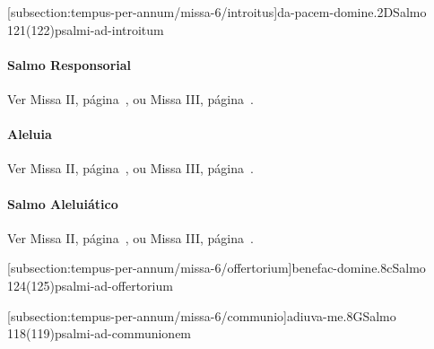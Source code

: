 \def\Prefix{subsection:tempus-per-annum/missa-6}

[\Prefix/introitus]{da-pacem-domine.2D}{Salmo 121(122)}{psalmi-ad-introitum}

\paragraph{Salmo Responsorial}
\begin{rubrica}
  Ver Missa II, página~\pageref{subsection:tempus-per-annum/missa-2/psalmus-responsorius}, ou Missa III, página~\pageref{subsection:tempus-per-annum/missa-3/psalmus-responsorius}.
\end{rubrica}

\paragraph{Aleluia}
\begin{rubrica}
  Ver Missa II, página~\pageref{subsection:tempus-per-annum/missa-2/alleluia}, ou Missa III, página~\pageref{subsection:tempus-per-annum/missa-3/alleluia}.
\end{rubrica}

\paragraph{Salmo Aleluiático}
\begin{rubrica}
  Ver Missa II, página~\pageref{subsection:tempus-per-annum/missa-2/psalmus-alleluiaticus}, ou Missa III, página~\pageref{subsection:tempus-per-annum/missa-3/psalmus-alleluiaticus}.
\end{rubrica}

\AllowPageFlush

[\Prefix/offertorium]{benefac-domine.8c}{Salmo 124(125)}{psalmi-ad-offertorium}

\AllowPageFlush

[\Prefix/communio]{adiuva-me.8G}{Salmo 118(119)}{psalmi-ad-communionem}